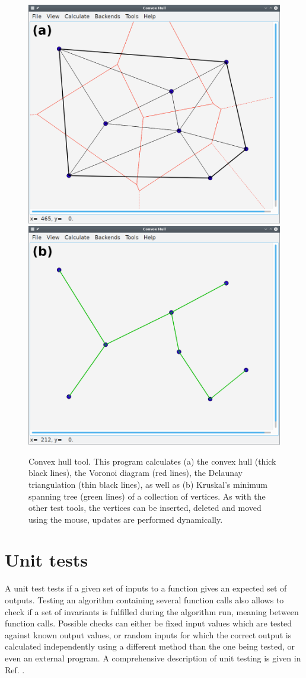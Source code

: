 \begin{figure}[h]
	\centering
	\includegraphics[width = 0.49 \textwidth]{figures/hullgui_voro}
	\hspace{0.05cm}
	\includegraphics[width = 0.49 \textwidth]{figures/hullgui_kruskal}
	\caption[Convex hull tool.]{Convex hull tool.
		This program calculates 
		(a) the convex hull (thick black lines), the Voronoi diagram (red lines), 
			the Delaunay triangulation (thin black lines), as well as
		(b) Kruskal's minimum spanning tree (green lines)
		of a collection of vertices.
		As with the other test tools, the vertices can be inserted, deleted and moved 
		using the mouse, updates are performed dynamically.
		\label{fig:hullgui}}
\end{figure}




\section{Unit tests}
\label{sec:unit_tests}
A unit test tests if a given set of inputs to a function gives an expected set of outputs.
Testing an algorithm containing several function calls also allows to check if a set of invariants
is fulfilled during the algorithm run, meaning between function calls.
Possible checks can either be fixed input values which are tested against known output values,
or random inputs for which the correct output is calculated independently using a different 
method than the one being tested, or even an external program.
A comprehensive description of unit testing is given in Ref. \cite[Ch. 3, pp. 73-105]{FUH_prog2019}.

